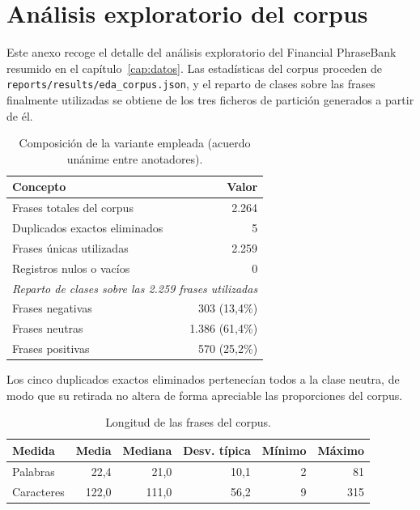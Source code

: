 \chapter{Análisis exploratorio del corpus}
\label{anx:eda}

Este anexo recoge el detalle del análisis exploratorio del Financial PhraseBank
resumido en el capítulo~\ref{cap:datos}. Las estadísticas del corpus proceden de
\texttt{reports/results/eda\_corpus.json}, y el reparto de clases sobre las
frases finalmente utilizadas se obtiene de los tres ficheros de partición
generados a partir de él.

\begin{table}[htbp]
  \centering
  \caption{Composición de la variante empleada (acuerdo unánime entre anotadores).}
  \label{tab:anx-corpus}
  \begin{tabular}{lr}
    \toprule
    Concepto & Valor \\
    \midrule
    Frases totales del corpus       & 2.264 \\
    Duplicados exactos eliminados   & 5 \\
    Frases únicas utilizadas        & 2.259 \\
    Registros nulos o vacíos        & 0 \\
    \midrule
    \multicolumn{2}{l}{\textit{Reparto de clases sobre las 2.259 frases utilizadas}} \\
    Frases negativas                & 303 (13,4\%) \\
    Frases neutras                  & 1.386 (61,4\%) \\
    Frases positivas                & 570 (25,2\%) \\
    \bottomrule
  \end{tabular}
\end{table}

Los cinco duplicados exactos eliminados pertenecían todos a la clase neutra, de
modo que su retirada no altera de forma apreciable las proporciones del corpus.

\begin{table}[htbp]
  \centering
  \caption{Longitud de las frases del corpus.}
  \label{tab:anx-longitudes}
  \begin{tabular}{lrrrrr}
    \toprule
    Medida & Media & Mediana & Desv. típica & Mínimo & Máximo \\
    \midrule
    Palabras    & 22,4  & 21,0  & 10,1 & 2 & 81  \\
    Caracteres  & 122,0 & 111,0 & 56,2 & 9 & 315 \\
    \bottomrule
  \end{tabular}
\end{table}

